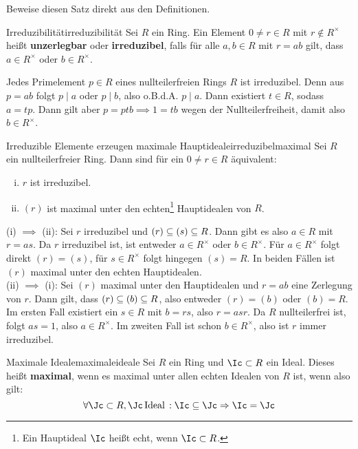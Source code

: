\begin{übung}
Beweise diesen Satz direkt aus den Definitionen.
\end{übung}
\begin{definition}{Irreduzibilität}{irreduzibilität}
Sei $R$ ein Ring. Ein Element $0 \neq r \in R$ mit $r \notin R^\times$ heißt \textbf{unzerlegbar} oder \textbf{irreduzibel}, falls für alle $a,b \in R$ mit $r=ab$ gilt, dass $a \in R^\times$ oder $b \in R^\times$.
\end{definition}
\begin{beispiel}
Jedes Primelement $p \in R$ eines nullteilerfreien Rings $R$ ist irreduzibel. Denn aus $p = ab$ folgt $p \mid a$ oder $p \mid b$, also o.B.d.A. $p \mid a$. Dann existiert $t \in R$, sodass $a = tp$. Dann gilt aber $p=ptb \implies 1 = tb$ wegen der Nullteilerfreiheit, damit also $b \in R^\times$.
\end{beispiel}
\begin{satz}{Irreduzible Elemente erzeugen maximale Hauptideale}{irreduzibelmaximal}
Sei $R$ ein nullteilerfreier Ring. Dann sind für ein $0 \neq r \in R$ äquivalent:
\begin{enumerate}[(i)]
\item $r$ ist irreduzibel.
\item $(r)$ ist maximal unter den echten\footnote{Ein Hauptideal $\Ic$ heißt echt, wenn $\Ic \subset R$.} Hauptidealen von $R$.
\end{enumerate}
\end{satz}
\begin{beweis}
(i) $\implies$ (ii): Sei $r$ irreduzibel und $(r) \subseteq (s) \subseteq R$. Dann gibt es also $a \in R$ mit $r = as$. Da $r$ irreduzibel ist, ist entweder $a \in R^\times$ oder $b \in R^\times$. Für $a \in R^\times$ folgt direkt $(r)=(s)$, für $s \in R^\times$ folgt hingegen $(s)=R$. In beiden Fällen ist $(r)$ maximal unter den echten Hauptidealen.\\
(ii) $\implies$ (i): Sei $(r)$ maximal unter den Hauptidealen und $r=ab$ eine Zerlegung von $r$. Dann gilt, dass $(r)\subseteq (b) \subseteq R$, also entweder $(r) = (b)$ oder $(b)=R$. Im ersten Fall existiert ein $s \in R$ mit $b=rs$, also $r = asr$. Da $R$ nullteilerfrei ist, folgt $as=1$, also $a \in R^\times$. Im zweiten Fall ist schon $b \in R^\times$, also ist $r$ immer irreduzibel.
\end{beweis}
\begin{definition}{Maximale Ideale}{maximaleideale}
Sei $R$ ein Ring und $\Ic \subset R$ ein Ideal. Dieses heißt \textbf{maximal}, wenn es maximal unter allen echten Idealen von $R$ ist, wenn also gilt:
\begin{equation}
\forall \Jc \subset R, \Jc \, \text{Ideal} \, : \Ic \sub \Jc \implies \Ic = \Jc
\end{equation}
\end{definition}
